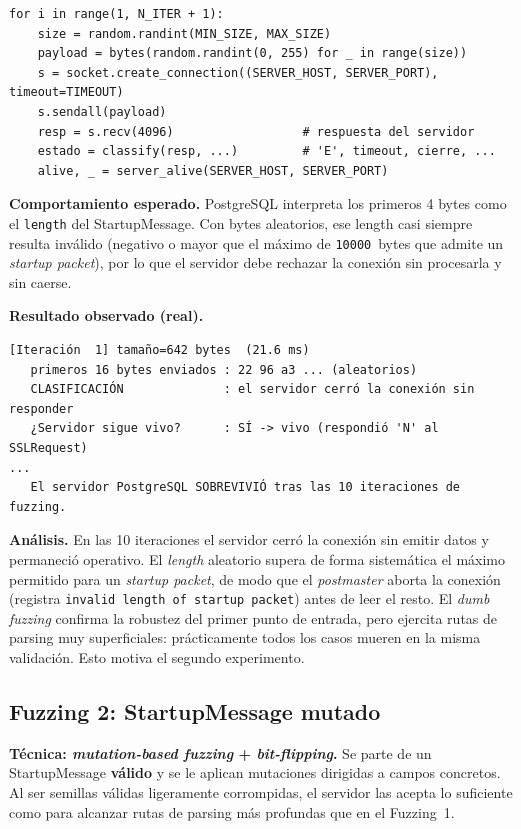 \documentclass[11pt]{article}
\begin{document}
\begin{lstlisting}[style=python, caption={Bucle principal de \texttt{fuzzing\_1.py}.}]
for i in range(1, N_ITER + 1):
    size = random.randint(MIN_SIZE, MAX_SIZE)
    payload = bytes(random.randint(0, 255) for _ in range(size))
    s = socket.create_connection((SERVER_HOST, SERVER_PORT), timeout=TIMEOUT)
    s.sendall(payload)
    resp = s.recv(4096)                  # respuesta del servidor
    estado = classify(resp, ...)         # 'E', timeout, cierre, ...
    alive, _ = server_alive(SERVER_HOST, SERVER_PORT)
\end{lstlisting}

\textbf{Comportamiento esperado.} PostgreSQL interpreta los primeros 4 bytes como
el \texttt{length} del StartupMessage. Con bytes aleatorios, ese length casi
siempre resulta inválido (negativo o mayor que el máximo de
\texttt{10000}~bytes que admite un \emph{startup packet}), por lo que el servidor
debe rechazar la conexión sin procesarla y sin caerse.

\textbf{Resultado observado (real).}
\begin{lstlisting}[style=salida]
[Iteración  1] tamaño=642 bytes  (21.6 ms)
   primeros 16 bytes enviados : 22 96 a3 ... (aleatorios)
   CLASIFICACIÓN              : el servidor cerró la conexión sin responder
   ¿Servidor sigue vivo?      : SÍ -> vivo (respondió 'N' al SSLRequest)
...
   El servidor PostgreSQL SOBREVIVIÓ tras las 10 iteraciones de fuzzing.
\end{lstlisting}

\textbf{Análisis.} En las 10 iteraciones el servidor cerró la conexión sin
emitir datos y permaneció operativo. El \emph{length} aleatorio supera de forma
sistemática el máximo permitido para un \emph{startup packet}, de modo que el
\emph{postmaster} aborta la conexión (registra \texttt{invalid length of startup
packet}) antes de leer el resto. El \emph{dumb fuzzing} confirma la robustez del
primer punto de entrada, pero ejercita rutas de parsing muy superficiales:
prácticamente todos los casos mueren en la misma validación. Esto motiva el
segundo experimento.

\subsection{Fuzzing 2: StartupMessage mutado}
\label{sec:fuzz2}
\textbf{Técnica: \emph{mutation-based fuzzing} + \emph{bit-flipping}.} Se parte
de un StartupMessage \textbf{válido} y se le aplican mutaciones dirigidas a
campos concretos. Al ser semillas válidas ligeramente corrompidas, el servidor
las acepta lo suficiente como para alcanzar rutas de parsing más profundas que
en el Fuzzing~1.
\end{document}
